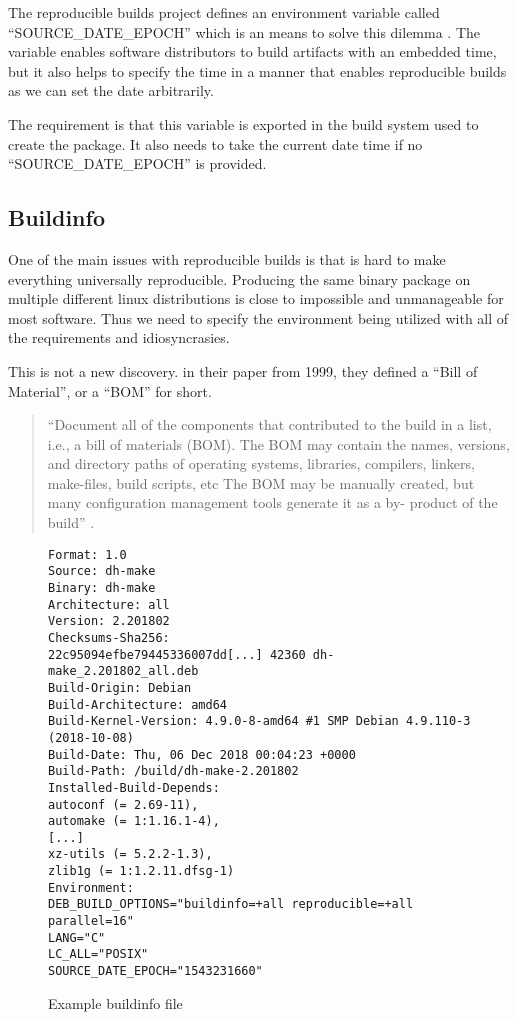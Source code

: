\documentclass[../Main/thesis.tex]{subfiles}
\begin{document}
The reproducible builds project defines an environment variable called
``SOURCE\_DATE\_EPOCH'' which is an means to solve this dilemma
\cite{reproducible-builds-2019-source-date-epoch}. The variable enables software
distributors to build artifacts with an embedded time, but it also helps to
specify the time in a manner that enables reproducible builds as we can set the
date arbitrarily.

The requirement is that this variable is exported in the build system used to
create the package. It also needs to take the current date time if no
``SOURCE\_DATE\_EPOCH'' is provided.

\subsection*{Buildinfo}
One of the main issues with reproducible builds is that is hard to make
everything universally reproducible. Producing the same binary package on
multiple different linux distributions is close to impossible and unmanageable
for most software. Thus we need to specify the environment being utilized with
all of the requirements and idiosyncrasies.

This is not a new discovery.
\citeauthor{r.-torres-cabrera-and-bonnie-lee-appleton-1999} in their paper
 from 1999, they
defined a ``Bill of Material'', or a ``BOM'' for short.

\begin{quotation}
``Document all of the components that contributed to the build in a list, i.e.,
a bill of materials (BOM). The BOM may contain the names, versions, and
directory paths of operating systems, libraries, compilers, linkers, make-files,
build scripts, etc The BOM may be manually created, but many configuration
management tools generate it as a by- product of the build'' \cite{r.-torres-cabrera-and-bonnie-lee-appleton-1999}.
\end{quotation}

\begin{figure}[H]
\begin{verbatim}
Format: 1.0
Source: dh-make
Binary: dh-make
Architecture: all
Version: 2.201802
Checksums-Sha256:
22c95094efbe79445336007dd[...] 42360 dh-make_2.201802_all.deb
Build-Origin: Debian
Build-Architecture: amd64
Build-Kernel-Version: 4.9.0-8-amd64 #1 SMP Debian 4.9.110-3 (2018-10-08)
Build-Date: Thu, 06 Dec 2018 00:04:23 +0000
Build-Path: /build/dh-make-2.201802
Installed-Build-Depends:
autoconf (= 2.69-11),
automake (= 1:1.16.1-4),
[...]
xz-utils (= 5.2.2-1.3),
zlib1g (= 1:1.2.11.dfsg-1)
Environment:
DEB_BUILD_OPTIONS="buildinfo=+all reproducible=+all parallel=16"
LANG="C"
LC_ALL="POSIX"
SOURCE_DATE_EPOCH="1543231660"
\end{verbatim}
\caption{Example buildinfo file}
\label{fig:buildinfo}
\end{figure}
\end{document}
